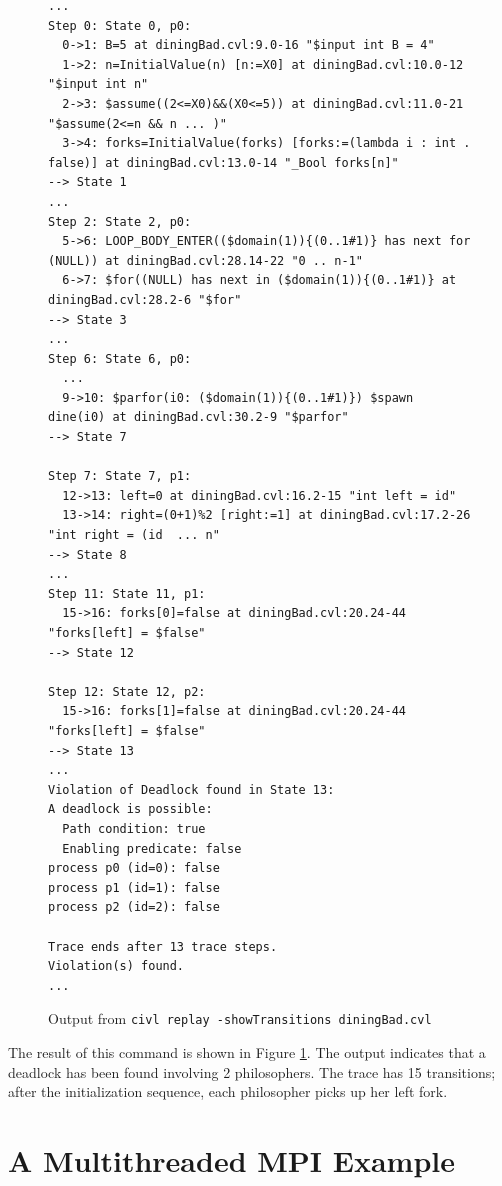 \begin{figure}
  \begin{small}
\begin{verbatim}
...
Step 0: State 0, p0:
  0->1: B=5 at diningBad.cvl:9.0-16 "$input int B = 4"
  1->2: n=InitialValue(n) [n:=X0] at diningBad.cvl:10.0-12 "$input int n"
  2->3: $assume((2<=X0)&&(X0<=5)) at diningBad.cvl:11.0-21 "$assume(2<=n && n ... )"
  3->4: forks=InitialValue(forks) [forks:=(lambda i : int . false)] at diningBad.cvl:13.0-14 "_Bool forks[n]"
--> State 1
...
Step 2: State 2, p0:
  5->6: LOOP_BODY_ENTER(($domain(1)){(0..1#1)} has next for (NULL)) at diningBad.cvl:28.14-22 "0 .. n-1"
  6->7: $for((NULL) has next in ($domain(1)){(0..1#1)} at diningBad.cvl:28.2-6 "$for"
--> State 3
...
Step 6: State 6, p0:
  ...
  9->10: $parfor(i0: ($domain(1)){(0..1#1)}) $spawn dine(i0) at diningBad.cvl:30.2-9 "$parfor"
--> State 7

Step 7: State 7, p1:
  12->13: left=0 at diningBad.cvl:16.2-15 "int left = id"
  13->14: right=(0+1)%2 [right:=1] at diningBad.cvl:17.2-26 "int right = (id  ... n"
--> State 8
...
Step 11: State 11, p1:
  15->16: forks[0]=false at diningBad.cvl:20.24-44 "forks[left] = $false"
--> State 12

Step 12: State 12, p2:
  15->16: forks[1]=false at diningBad.cvl:20.24-44 "forks[left] = $false"
--> State 13
...
Violation of Deadlock found in State 13:
A deadlock is possible:
  Path condition: true
  Enabling predicate: false
process p0 (id=0): false
process p1 (id=1): false
process p2 (id=2): false

Trace ends after 13 trace steps.
Violation(s) found.
...
\end{verbatim}
  \end{small}
  \caption{Output from \texttt{civl replay -showTransitions diningBad.cvl}}
  \label{fig:diningReplay}
\end{figure}

The result of this command is shown in Figure \ref{fig:diningReplay}.
The output indicates that a deadlock has been found involving 2
philosophers. The trace has 15 transitions; after the initialization
sequence, each philosopher picks up her left fork.

\section{A Multithreaded MPI Example}

